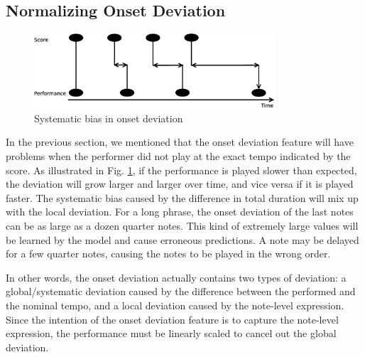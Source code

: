    \subsection{Normalizing Onset Deviation}
   \label{sec:normalize}
\begin{figure}[tp]
   \begin{center}
      \includegraphics[width=0.8\textwidth]{fig/prob_onset_diff}

   \end{center}
   \caption{Systematic bias in onset deviation }
   \label{fig:normalizationprob}
\end{figure}
%
In the previous section, we mentioned that the onset deviation feature will have problems when the performer did not play at the exact tempo indicated by the score. As illustrated in Fig. \ref{fig:normalizationprob}, if the performance is played slower than expected, the deviation will grow larger and larger over time, and vice versa if it is played faster. The systematic bias caused by the difference in total duration will mix up with the local deviation. For a long phrase, the onset deviation of the last notes can be as large as a dozen quarter notes. This kind of extremely large values will be learned by the model and cause erroneous predictions. A note may be delayed for a few quarter notes, causing the notes to be played in the wrong order.
 
In other words, the onset deviation actually contains two types of deviation: a global/systematic deviation caused by the difference between the performed and the nominal tempo, and a local deviation caused by the note-level expression. Since the intention of the onset deviation feature is to capture the note-level expression, the performance must be linearly scaled to cancel out the global deviation.

